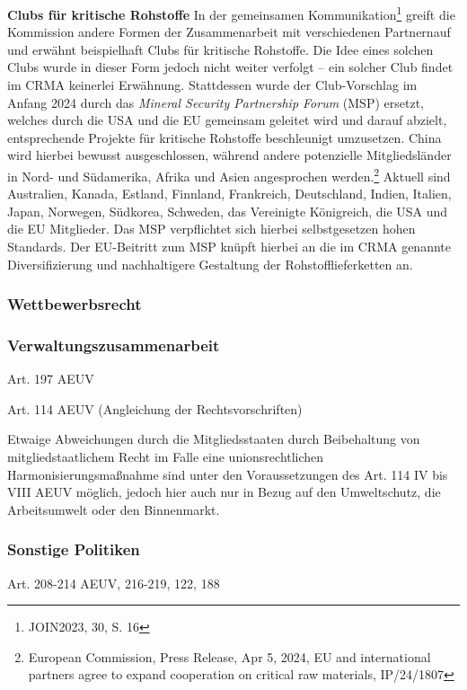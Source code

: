 \documentclass[12pt,a4paper,oneside]{book} %
\begin{document}
\textbf{Clubs für kritische Rohstoffe}
In der gemeinsamen Kommunikation\footnote{JOIN2023, 30, S. 16} greift die Kommission \glqq andere Formen der Zusammenarbeit mit verschiedenen Partnern\grqq auf und erwähnt beispielhaft \glqq Clubs für kritische Rohstoffe\glqq. Die Idee eines solchen Clubs wurde in dieser Form jedoch nicht weiter verfolgt -- ein solcher Club findet im CRMA keinerlei Erwähnung. Stattdessen wurde der Club-Vorschlag im Anfang 2024 durch das \textit{Mineral Security Partnership Forum} (MSP) ersetzt, welches durch die USA und die EU gemeinsam geleitet wird und darauf abzielt, entsprechende Projekte für kritische Rohstoffe beschleunigt umzusetzen. China wird hierbei bewusst ausgeschlossen, während andere potenzielle Mitgliedsländer in Nord- und Südamerika, Afrika und Asien angesprochen werden.\footnote{European Commission, Press Release, Apr 5, 2024, EU and international partners agree to expand cooperation on critical raw materials, IP/24/1807} Aktuell sind Australien, Kanada, Estland, Finnland, Frankreich, Deutschland, Indien, Italien, Japan, Norwegen, Südkorea, Schweden, das Vereinigte Königreich, die USA und die EU Mitglieder.
Das MSP verpflichtet sich hierbei selbstgesetzen hohen Standards.\autocite{US Department of State, Minerals Security Partnership. Principles for Responsible Critical Mineral Supply Chains}
Der EU-Beitritt zum MSP knüpft hierbei an die im CRMA genannte Diversifizierung und nachhaltigere Gestaltung der Rohstofflieferketten an.
	

	
\subsubsection{Wettbewerbsrecht}
	
\subsubsection{Verwaltungszusammenarbeit}
Art. 197 AEUV
	
Art. 114 AEUV (Angleichung der Rechtsvorschriften)
	
Etwaige Abweichungen durch die Mitgliedsstaaten durch Beibehaltung von mitgliedstaatlichem Recht im Falle eine unionsrechtlichen Harmonisierungsmaßnahme sind unter den Voraussetzungen des Art. 114 IV bis VIII AEUV möglich, jedoch hier auch nur in Bezug auf den Umweltschutz, die Arbeitsumwelt oder den Binnenmarkt.
	
	
	
\subsubsection{Sonstige Politiken}
Art. 208-214 AEUV, 216-219, 122, 188
	
\end{document}
